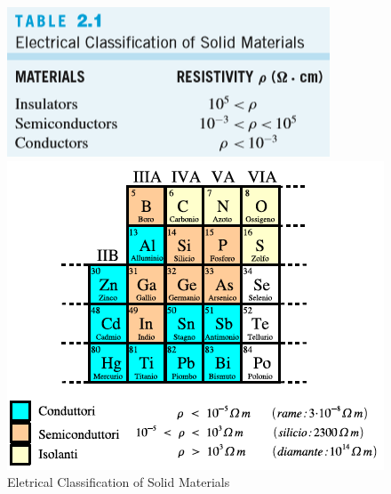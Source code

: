 \begin{figure}[htbp]
    \begin{minipage}[htbp]{0.5\textwidth}
        \centering
        \includegraphics[width=0.8\linewidth]{img/ECSM.png}
        \caption{Eletrical Classification of Solid Materials} 
    \end{minipage}
    \begin{minipage}[htbp]{0.5\textwidth}
    \centering

    \includegraphics[width=0.8\linewidth]{img/TavolaPeriodica.png}    

    
    \end{minipage}
\end{figure}





